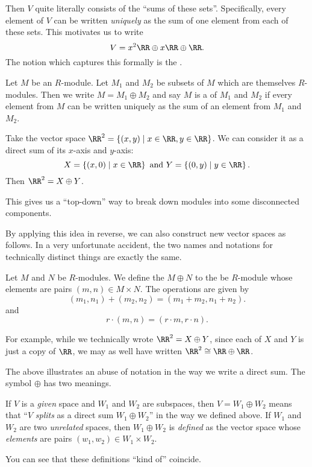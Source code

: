Then $V$ quite literally consists of the ``sums of these sets''.
Specifically, every element of $V$ can be written \emph{uniquely}
as the sum of one element from each of these sets.
This motivates us to write
\[ V = x^2\RR \oplus x\RR \oplus \RR. \]
The notion which captures this formally is the .

\begin{definition}
	Let $M$ be an $R$-module.
	Let $M_1$ and $M_2$ be subsets of $M$ which are themselves $R$-modules.
	Then we write $M = M_1 \oplus M_2$ and say $M$ is a 
	of $M_1$ and $M_2$
	if every element from $M$ can be written uniquely as the sum
	of an element from $M_1$ and $M_2$.
\end{definition}
\begin{example}
	Take the vector space $\RR^2 = \left\{ (x,y) \mid x \in \RR, y \in \RR \right\}$.
	We can consider it as a direct sum of its $x$-axis and $y$-axis:
	\[ X = \left\{ (x,0) \mid x \in \RR  \right\} 
		\text{ and }
		Y = \left\{ (0,y) \mid y \in \RR \right\}. \]
	Then $\RR^2 = X \oplus Y$.
\end{example}

This gives us a ``top-down'' way to break down modules
into some disconnected components.

By applying this idea in reverse, we can also construct
new vector spaces as follows.
In a very unfortunate accident, the two names and notations for technically
distinct things are exactly the same.
\begin{definition}
	Let $M$ and $N$ be $R$-modules.
	We define the  $M \oplus N$
	to the be $R$-module whose elements are pairs $(m,n) \in M \times N$.
	The operations are given by
	\[ (m_1, n_1) + (m_2, n_2) = (m_1+m_2, n_1+n_2). \]
	and
	\[ r \cdot (m, n) = (r \cdot m, r \cdot n). \]
\end{definition}

For example, while we technically wrote $\RR^2 = X \oplus Y$,
since each of $X$ and $Y$ is just a copy of $\RR$,
we may as well have written $\RR^2 \cong \RR \oplus \RR$.

\begin{abuse}
	The above illustrates an abuse of notation in the way we write a direct sum. The symbol $\oplus$ has two meanings.
	\begin{itemize}
		\ii If $V$ is a \emph{given} space and $W_1$ and $W_2$ are subspaces, then $V = W_1 \oplus W_2$ means that ``$V$ \emph{splits} as a direct sum $W_1 \oplus W_2$'' in the way we defined above.
		\ii If $W_1$ and $W_2$ are two \emph{unrelated} spaces, then $W_1 \oplus W_2$ is \emph{defined} as the vector space whose \emph{elements} are pairs $(w_1, w_2) \in W_1 \times W_2$.
	\end{itemize}
	You can see that these definitions ``kind of'' coincide.
\end{abuse}

